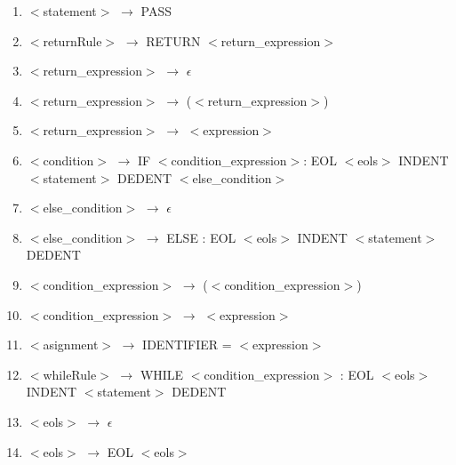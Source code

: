 \documentclass[12pt]{article}
\begin{document}
\begin{enumerate}
    \item $<$statement$>$ $\rightarrow$ PASS
    \item $<$returnRule$>$ $\rightarrow$ RETURN $<$return\_expression$>$
    \item $<$return\_expression$>$ $\rightarrow$ $\epsilon$
    \item $<$return\_expression$>$ $\rightarrow$ ($<$return\_expression$>$)
    \item $<$return\_expression$>$ $\rightarrow$ $<$expression$>$
    \item $<$condition$>$ $\rightarrow$ IF $<$condition\_expression$>$: EOL $<$eols$>$ INDENT $<$statement$>$ DEDENT $<$else\_condition$>$
    \item $<$else\_condition$>$ $\rightarrow$ $\epsilon$
    \item $<$else\_condition$>$ $\rightarrow$ ELSE : EOL $<$eols$>$ INDENT $<$statement$>$ DEDENT
    \item $<$condition\_expression$>$ $\rightarrow$ ($<$condition\_expression$>$)
    \item $<$condition\_expression$>$ $\rightarrow$ $<$expression$>$
    \item $<$asignment$>$ $\rightarrow$ IDENTIFIER = $<$expression$>$
    \item $<$whileRule$>$ $\rightarrow$ WHILE $<$condition\_expression$>$ : EOL $<$eols$>$ INDENT $<$statement$>$ DEDENT
    \item $<$eols$>$ $\rightarrow$ $\epsilon$
    \item $<$eols$>$ $\rightarrow$ EOL $<$eols$>$
\end{enumerate}
\end{document}
